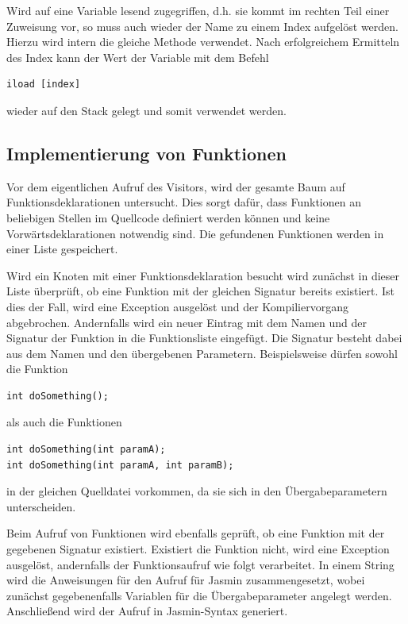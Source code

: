 Wird auf eine Variable lesend zugegriffen, d.h. sie kommt im rechten Teil einer Zuweisung vor, so muss auch wieder der Name zu einem Index aufgelöst werden. Hierzu wird intern die gleiche Methode verwendet. Nach erfolgreichem Ermitteln des Index kann der Wert der Variable mit dem Befehl 
\begin{lstlisting}[frame=single]
iload [index]
\end{lstlisting}
wieder auf den Stack gelegt und somit verwendet werden.

\subsection{Implementierung von Funktionen}
Vor dem eigentlichen Aufruf des Visitors, wird der gesamte Baum auf Funktionsdeklarationen untersucht. Dies sorgt dafür, dass Funktionen an beliebigen Stellen im Quellcode definiert werden können und keine Vorwärtsdeklarationen notwendig sind. Die gefundenen Funktionen werden in einer Liste gespeichert.


Wird ein Knoten mit einer Funktionsdeklaration besucht wird zunächst in dieser Liste überprüft, ob eine Funktion mit der gleichen Signatur bereits existiert. Ist dies der Fall, wird eine Exception ausgelöst und der Kompiliervorgang abgebrochen. Andernfalls wird ein neuer Eintrag mit dem Namen und der Signatur der Funktion in die Funktionsliste eingefügt.
Die Signatur besteht dabei aus dem Namen und den übergebenen Parametern. Beispielsweise dürfen sowohl die Funktion
\begin{lstlisting}[frame=single]
int doSomething();
\end{lstlisting}
als auch die Funktionen
\begin{lstlisting}[frame=single]
int doSomething(int paramA);
int doSomething(int paramA, int paramB);
\end{lstlisting}
in der gleichen Quelldatei vorkommen, da sie sich in den Übergabeparametern unterscheiden.

Beim Aufruf von Funktionen wird ebenfalls geprüft, ob eine Funktion mit der gegebenen Signatur existiert. Existiert die Funktion nicht, wird eine Exception ausgelöst, andernfalls der Funktionsaufruf wie folgt verarbeitet. 
In einem String wird die Anweisungen für den Aufruf für Jasmin zusammengesetzt, wobei zunächst gegebenenfalls Variablen für die Übergabeparameter angelegt werden. 
Anschließend wird der Aufruf in Jasmin-Syntax generiert.

